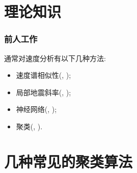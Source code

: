 \documentclass[10pt]{beamer}
\begin{document}
{%


\section{理论知识}

\begin{frame}[c]
    \frametitle{前人工作}
    \vspace{10pt}
    通常对速度分析有以下几种方法: 
        \begin{itemize}
            \item 速度谱相似性(\citeauthor{Gan2016}, \citeyear{Gan2016}); 
            \item 局部地震斜率(\citeauthor{Fomel2007}, \citeyear{Fomel2007}); 
            \item 神经网络(\citeauthor{Wang2021}, \citeyear{Wang2021}); 
            \item 聚类(\citeauthor{Zhang2016}, \citeyear{Zhang2016}). 
        \end{itemize}
\end{frame}

\section{几种常见的聚类算法}

}
\end{document}
